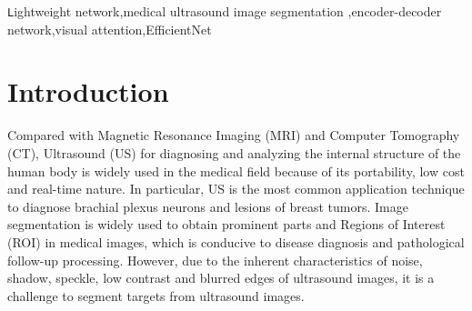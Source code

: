 \documentclass[review]{elsarticle}
\begin{document}
\begin{frontmatter}
\begin{abstract}
Automatic ultrasound image segmentation plays an important role in early diagnosis of human diseases. This paper introduces a novel and efficient encoder-decoder network, called Lightweight Attention Encoder-Decoder Network (LAEDNet), for automatic ultrasound image segmentation. In contrast to previous encoder-decoder networks that involve complicated architecture with numerous parameters, our LAEDNet adopts lightweight version of EfficientNet as encoder. On the other hand, a Lightweight Residual Squeeze-and-Excitation (LRSE) block is employed in decoder. To achieve trade-off between segmentation accuracy and implementing efficiency, we also present a family of models, from light to heavy (denoted as LAEDNet-S, LAEDNet-M, and LAEDNet-L, respectively), with varying lightweight version of EfficientNet backbones. To evaluate LAEDNet, we have conducted extensive experiments on Brachial Plexus Dataset (BP), Breast Ultrasound Images Dataset (BUSI), and Head Circumference Ultrasound Images Dataset (HCUS), where ultrasound images are suffered from high noise, blurred borders and low contrast. The experiments show that, compared with U-Net and its variants, e.g., M-Net, U-Net++ and TransUNet, our LAEDNet achieves better results in terms of Dice Coefficient (DSC) and running speed. Particularly, LAEDNet-M only has 10.75M model parameters with 40.7 FPS, yet obtaining 73.0\%, 73.8\% and 91.3\% DSC on BP, BUSI and HCUS datasets, respectively.
\end{abstract}

\begin{keyword}
\texttt Lightweight network\sep medical ultrasound image segmentation \sep encoder-decoder network\sep visual attention\sep EfficientNet
\end{keyword}

\end{frontmatter}


\section{Introduction}

Compared with Magnetic Resonance Imaging (MRI) and Computer Tomography (CT), Ultrasound (US) for diagnosing and analyzing the internal structure of the human body is widely used in the medical field because of its portability, low cost and real-time nature\cite{2018Nerve}. In particular, US is the most common application technique to diagnose brachial plexus neurons and lesions of breast tumors\cite{xue2021global}. Image segmentation is widely used to obtain prominent parts and Regions of Interest (ROI) in medical images, which is conducive to disease diagnosis and pathological follow-up processing. However, due to the inherent characteristics of noise, shadow, speckle, low contrast and blurred edges of ultrasound images, it is a challenge to segment targets from ultrasound images.
\end{document}
